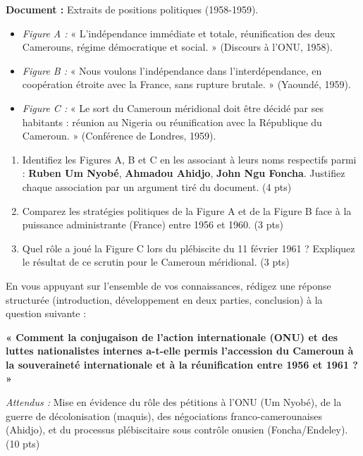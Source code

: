 \documentclass[11pt]{article}
\begin{document}
\begin{exercice}
\textbf{Document :} Extraits de positions politiques (1958-1959).
\begin{itemize}
    \item \textit{Figure A :} « L'indépendance immédiate et totale, réunification des deux Camerouns, régime démocratique et social. » (Discours à l'ONU, 1958).
    \item \textit{Figure B :} « Nous voulons l'indépendance dans l'interdépendance, en coopération étroite avec la France, sans rupture brutale. » (Yaoundé, 1959).
    \item \textit{Figure C :} « Le sort du Cameroun méridional doit être décidé par ses habitants : réunion au Nigeria ou réunification avec la République du Cameroun. » (Conférence de Londres, 1959).
\end{itemize}

\begin{enumerate}
    \item Identifiez les Figures A, B et C en les associant à leurs noms respectifs parmi : \textbf{Ruben Um Nyobé}, \textbf{Ahmadou Ahidjo}, \textbf{John Ngu Foncha}. Justifiez chaque association par un argument tiré du document. (4 pts)
    \item Comparez les stratégies politiques de la Figure A et de la Figure B face à la puissance administrante (France) entre 1956 et 1960. (3 pts)
    \item Quel rôle a joué la Figure C lors du plébiscite du 11 février 1961 ? Expliquez le résultat de ce scrutin pour le Cameroun méridional. (3 pts)
\end{enumerate}
\end{exercice}

\begin{exercice}
En vous appuyant sur l'ensemble de vos connaissances, rédigez une réponse structurée (introduction, développement en deux parties, conclusion) à la question suivante :

\textbf{« Comment la conjugaison de l'action internationale (ONU) et des luttes nationalistes internes a-t-elle permis l'accession du Cameroun à la souveraineté internationale et à la réunification entre 1956 et 1961 ? »}

\textit{Attendus :} Mise en évidence du rôle des pétitions à l'ONU (Um Nyobé), de la guerre de décolonisation (maquis), des négociations franco-camerounaises (Ahidjo), et du processus plébiscitaire sous contrôle onusien (Foncha/Endeley). (10 pts)
\end{exercice}
\end{document}

